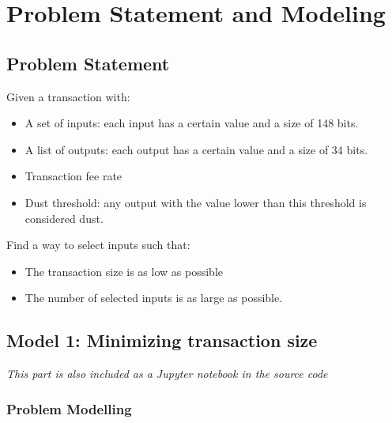 
\section{Problem Statement and Modeling}
  \subsection{Problem Statement}
    \par Given a transaction with:
      \begin{itemize}
        \item A set of inputs: each input has a certain value and a size of 148 bits.
        \item A list of outputs: each output has a certain value and a size of 34 bits.
        \item Transaction fee rate
        \item Dust threshold: any output with the value lower than this threshold is considered dust.
      \end{itemize}
    \par Find a way to select inputs such that:
      \begin{itemize}
        \item The transaction size is as low as possible
        \item The number of selected inputs is as large as possible.
      \end{itemize}

  \subsection{Model 1: Minimizing transaction size}
    {
      \small
      \textit{This part is also included as a Jupyter notebook in the source code}
    }

\subsubsection{Problem Modelling}

